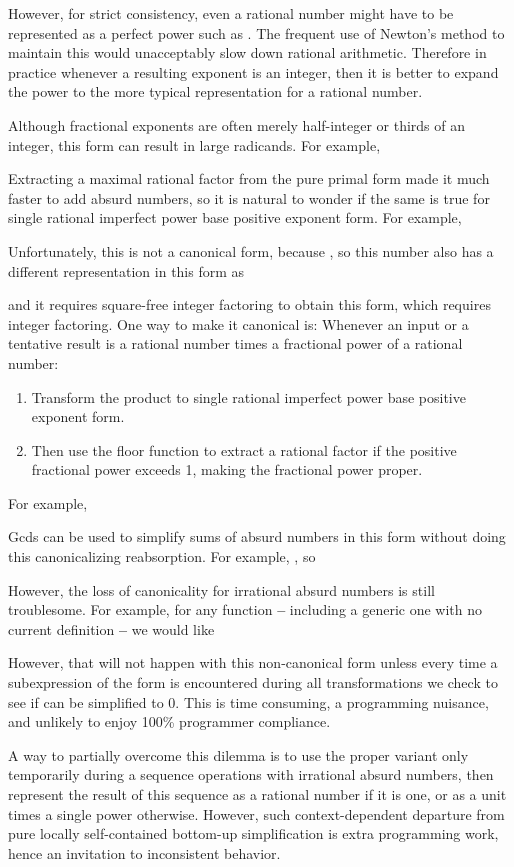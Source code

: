 \documentclass[12pt,english]{article}
\theoremstyle{definition}
\theoremstyle{remark}
\theoremstyle{plain}
\theoremstyle{plain}
\begin{document}
However, for strict consistency, even a rational number might have
to be represented as a perfect power such as .
The frequent use of Newton's method to maintain this would unacceptably
slow down rational arithmetic. Therefore in practice whenever a resulting
exponent is an integer, then it is better to expand the power to the
more typical representation for a rational number.

Although fractional exponents are often merely half-integer or thirds
of an integer, this form can result in large radicands. For example,



Extracting a maximal rational factor from the pure primal form made
it much faster to add absurd numbers, so it is natural to wonder if
the same is true for single rational imperfect power base positive
exponent form. For example,



Unfortunately, this is not a canonical form, because ,
so this number also has a different representation in this form as

and it requires square-free integer factoring to obtain this form,
which requires integer factoring. One way to make it canonical is:
Whenever an input or a tentative result is a rational number times
a fractional power of a rational number:
\begin{enumerate}
\item Transform the product to single rational imperfect power base positive
exponent form.
\item Then use the floor function to extract a rational factor if the positive
fractional power exceeds 1, making the fractional power proper.
\end{enumerate}
For example,

 Gcds can be used to simplify sums of absurd numbers in this form
without doing this canonicalizing reabsorption. For example, ,
so

However, the loss of canonicality for irrational absurd numbers is
still troublesome. For example, for any function  \textbf{--}
including a generic one with no current definition \textbf{--} we
would like

However, that will not happen with this non-canonical form unless
every time a subexpression of the form  is encountered
during all transformations we check to see if  can be simplified
to 0. This is time consuming, a programming nuisance, and unlikely
to enjoy 100\% programmer compliance.

A way to partially overcome this dilemma is to use the proper variant
only temporarily during a sequence operations with irrational absurd
numbers, then represent the result of this sequence as a rational
number if it is one, or as a unit times a single power otherwise.
However, such context-dependent departure from pure locally self-contained
bottom-up simplification is extra programming work, hence an invitation
to inconsistent behavior.
\end{document}
